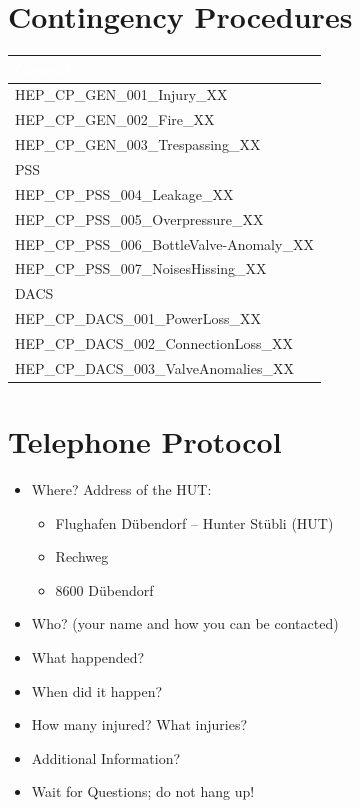 \documentclass{article}
\begin{document}
\section{Contingency Procedures}
\begin{tabularx}{0.9\textwidth}{|X|}
    \cellcolor{blue} \textcolor{white}{General} \\ \hline
    HEP\_CP\_GEN\_001\_Injury\_XX \\ \hline
    HEP\_CP\_GEN\_002\_Fire\_XX \\ \hline
    HEP\_CP\_GEN\_003\_Trespassing\_XX \\ \hline
    \cellcolor{orange} PSS \\ \hline
    HEP\_CP\_PSS\_004\_Leakage\_XX \\ \hline
    HEP\_CP\_PSS\_005\_Overpressure\_XX \\ \hline
    HEP\_CP\_PSS\_006\_BottleValve-Anomaly\_XX \\ \hline
    HEP\_CP\_PSS\_007\_NoisesHissing\_XX \\ \hline
    \cellcolor{yellow} DACS \\ \hline
    HEP\_CP\_DACS\_001\_PowerLoss\_XX \\ \hline
    HEP\_CP\_DACS\_002\_ConnectionLoss\_XX \\ \hline
    HEP\_CP\_DACS\_003\_ValveAnomalies\_XX \\ \hline
\end{tabularx}

\section{Telephone Protocol}
\begin{itemize}
    \item Where? Address of the HUT:
    \begin{itemize}
        \item Flughafen Dübendorf – Hunter Stübli (HUT)
        \item Rechweg
        \item 8600 Dübendorf
    \end{itemize}
    \item Who? (your name and how you can be contacted)
    \item What happended?
    \item When did it happen?
    \item How many injured? What injuries?
    \item Additional Information?
    \item Wait for Questions; do not hang up!
\end{itemize}
\end{document}
